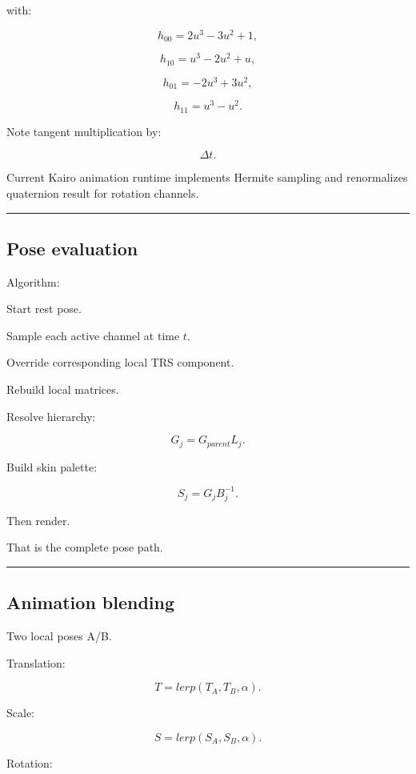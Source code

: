 with:

\[
h_{00}=2u^3-3u^2+1,
\]

\[
h_{10}=u^3-2u^2+u,
\]

\[
h_{01}=-2u^3+3u^2,
\]

\[
h_{11}=u^3-u^2.
\]

Note tangent multiplication by:

\[
\Delta t.
\]

Current Kairo animation runtime implements Hermite sampling and renormalizes quaternion result for rotation channels.

\begin{center}\rule{0.5\linewidth}{0.5pt}\end{center}

\subsection{Pose evaluation}\label{04-visual-computing-ii-ch041-pose-evaluation}

Algorithm:

Start rest pose.

Sample each active channel at time \(t\).

Override corresponding local TRS component.

Rebuild local matrices.

Resolve hierarchy:

\[
G_j=
G_{parent}L_j.
\]

Build skin palette:

\[
S_j=
G_jB_j^{-1}.
\]

Then render.

That is the complete pose path.

\begin{center}\rule{0.5\linewidth}{0.5pt}\end{center}

\subsection{Animation blending}\label{04-visual-computing-ii-ch041-animation-blending}

Two local poses A/B.

Translation:

\[
T=
lerp(T_A,T_B,\alpha).
\]

Scale:

\[
S=
lerp(S_A,S_B,\alpha).
\]

Rotation:

